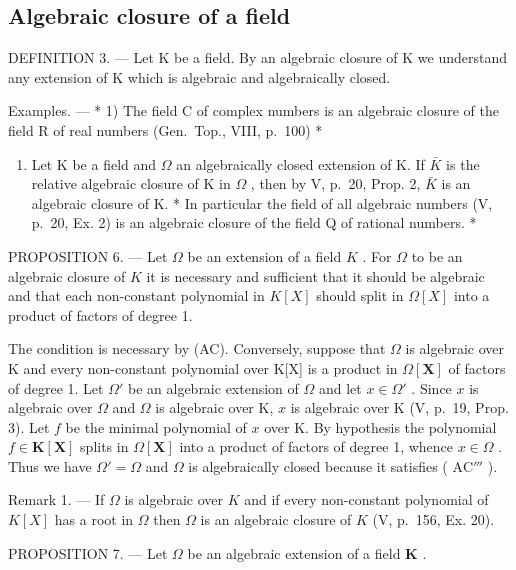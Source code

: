 \subsection{Algebraic closure of a field}

DEFINITION 3. --- Let K be a field. By an algebraic closure of K we understand any extension of K which is algebraic and algebraically closed.

Examples. --- * 1) The field C of complex numbers is an algebraic closure of the field R of real numbers (Gen.~Top., VIII, p.~100) *

\begin{enumerate}
\def\labelenumi{\arabic{enumi})}
\setcounter{enumi}{1}
\tightlist
\item
  Let K be a field and \(\Omega\) an algebraically closed extension of K. If \(\bar{K}\) is the relative algebraic closure of K in \(\Omega\) , then by V, p.~20, Prop. 2, \(\bar{K}\) is an algebraic closure of K. * In particular the field of all algebraic numbers (V, p.~20, Ex. 2) is an algebraic closure of the field Q of rational numbers. *
\end{enumerate}

PROPOSITION 6. --- Let \(\Omega\) be an extension of a field \(K\) . For \(\Omega\) to be an algebraic closure of \(K\) it is necessary and sufficient that it should be algebraic and that each non-constant polynomial in \(K[X]\) should split in \(\Omega[X]\) into a product of factors of degree 1.

The condition is necessary by (AC). Conversely, suppose that \(\Omega\) is algebraic over K and every non-constant polynomial over K{[}X{]} is a product in \(\Omega[\mathbf{X}]\) of factors of degree 1. Let \(\Omega'\) be an algebraic extension of \(\Omega\) and let \(x \in \Omega'\) . Since \(x\) is algebraic over \(\Omega\) and \(\Omega\) is algebraic over K, \(x\) is algebraic over K (V, p.~19, Prop. 3). Let \(f\) be the minimal polynomial of \(x\) over K. By hypothesis the polynomial \(f \in \mathbf{K}[\mathbf{X}]\) splits in \(\Omega[\mathbf{X}]\) into a product of factors of degree 1, whence \(x \in \Omega\) . Thus we have \(\Omega' = \Omega\) and \(\Omega\) is algebraically closed because it satisfies ( \(\mathrm{AC}'''\) ).

Remark 1. --- If \(\Omega\) is algebraic over \(K\) and if every non-constant polynomial of \(K[X]\) has a root in \(\Omega\) then \(\Omega\) is an algebraic closure of \(K\) (V, p.~156, Ex. 20).

PROPOSITION 7. --- Let \(\Omega\) be an algebraic extension of a field \(\mathbf{K}\) .

